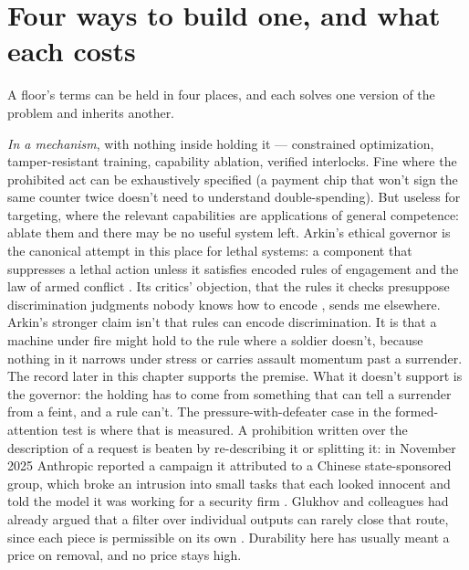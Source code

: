 \section{Four ways to build one, and what each costs}
\label{sec:18.1}
A floor's terms can be held in four places, and each solves one version of the problem and inherits another.

\emph{In a mechanism}, with nothing inside holding it — constrained optimization, tamper-resistant training, capability ablation, verified interlocks. Fine where the prohibited act can be exhaustively specified (a payment chip that won't sign the same counter twice doesn't need to understand double-spending). But useless for targeting, where the relevant capabilities are applications of general competence: ablate them and there may be no useful system left. Arkin's ethical governor is the canonical attempt in this place for lethal systems: a component that suppresses a lethal action unless it satisfies encoded rules of engagement and the law of armed conflict \autocite{arkin2009governing}. Its critics' objection, that the rules it checks presuppose discrimination judgments nobody knows how to encode \autocite{sharkey2012evitability}, sends me elsewhere. Arkin's stronger claim isn't that rules can encode discrimination. It is that a machine under fire might hold to the rule where a soldier doesn't, because nothing in it narrows under stress or carries assault momentum past a surrender. The record later in this chapter supports the premise. What it doesn't support is the governor: the holding has to come from something that can tell a surrender from a feint, and a rule can't. The pressure-with-defeater case in the formed-attention test is where that is measured. A prohibition written over the description of a request is beaten by re-describing it or splitting it: in November 2025 Anthropic reported a campaign it attributed to a Chinese state-sponsored group, which broke an intrusion into small tasks that each looked innocent and told the model it was working for a security firm \autocite{anthropic2025espionage}. Glukhov and colleagues had already argued that a filter over individual outputs can rarely close that route, since each piece is permissible on its own \autocite{glukhov2023censorship}. Durability here has usually meant a price on removal, and no price stays high.

